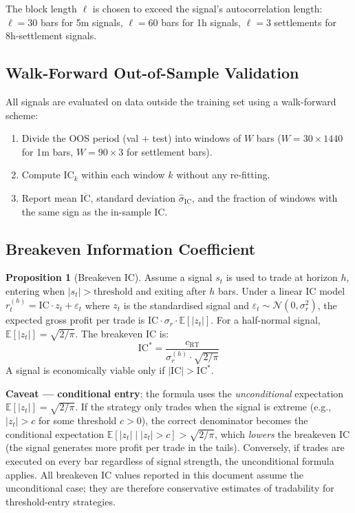 \documentclass[12pt, a4paper]{article}
\theoremstyle{definition}
\newtheorem{proposition}{Proposition}[section]
\newcommand{\IC}{\mathrm{IC}}
\newcommand{\E}{\mathbb{E}}
\begin{document}
The block length $\ell$ is chosen to exceed the signal's autocorrelation
length: $\ell = 30$ bars for 5m signals, $\ell = 60$ bars for 1h signals,
$\ell = 3$ settlements for 8h-settlement signals.

\subsection{Walk-Forward Out-of-Sample Validation}

All signals are evaluated on data outside the training set using a
walk-forward scheme:
\begin{enumerate}
  \item Divide the OOS period (val + test) into windows of $W$ bars
        ($W = 30 \times 1440$ for 1m bars, $W = 90 \times 3$ for settlement bars).
  \item Compute $\IC_k$ within each window $k$ without any re-fitting.
  \item Report mean $\overline{\IC}$, standard deviation $\hat{\sigma}_{\IC}$,
        and the fraction of windows with the same sign as the in-sample IC.
\end{enumerate}

\subsection{Breakeven Information Coefficient}

\begin{proposition}[Breakeven IC]
  Assume a signal $s_t$ is used to trade at horizon $h$, entering when
  $|s_t| > \text{threshold}$ and exiting after $h$ bars. Under a linear
  IC model $r^{(h)}_t = \IC \cdot z_t + \varepsilon_t$ where $z_t$ is the
  standardised signal and $\varepsilon_t \sim \mathcal{N}(0, \sigma_r^2)$,
  the expected gross profit per trade is $\IC \cdot \sigma_r \cdot \E[|z_t|]$.
  For a half-normal signal, $\E[|z_t|] = \sqrt{2/\pi}$. The breakeven IC is:
  \[
    \IC^* = \frac{c_{\text{RT}}}{\sigma_r^{(h)} \cdot \sqrt{2/\pi}}
  \]
  A signal is economically viable only if $|\IC| > \IC^*$.

  \textbf{Caveat — conditional entry}: the formula uses the \emph{unconditional}
  expectation $\E[|z_t|] = \sqrt{2/\pi}$.  If the strategy only trades when the
  signal is extreme (e.g., $|z_t| > c$ for some threshold $c > 0$), the correct
  denominator becomes the conditional expectation
  $\E[|z_t| \mid |z_t| > c] > \sqrt{2/\pi}$, which \emph{lowers} the breakeven
  IC (the signal generates more profit per trade in the tails).  Conversely,
  if trades are executed on every bar regardless of signal strength, the
  unconditional formula applies.  All breakeven IC values reported in this
  document assume the unconditional case; they are therefore conservative
  estimates of tradability for threshold-entry strategies.
\end{proposition}
\end{document}
